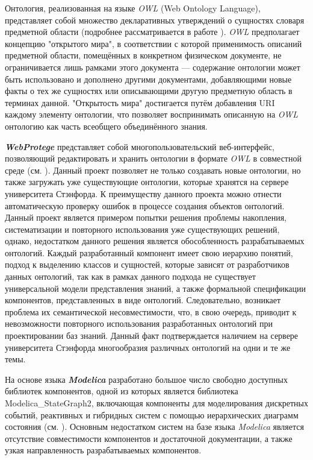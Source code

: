 Онтология, реализованная на языке \textit{OWL} (Web Ontology Language), представляет собой множество декларативных утверждений о сущностях словаря предметной области (подробнее рассматривается в работе ). \textit{OWL} предполагает концепцию "открытого мира"{}, в соответствии с которой применимость описаний предметной области, помещённых в конкретном физическом документе, не ограничивается лишь рамками этого документа --- содержание онтологии может быть использовано и дополнено другими документами, добавляющими новые факты о тех же сущностях или описывающими другую предметную область в терминах данной. "Открытость мира"{} достигается путём добавления URI каждому элементу онтологии, что позволяет воспринимать описанную на \textit{OWL} онтологию как часть всеобщего объединённого знания.

\textbf{\textit{WebProtege}} представляет собой многопользовательский веб-интерфейс, позволяющий редактировать и хранить онтологии в формате \textit{OWL} в совместной среде (см. ). Данный проект позволяет не только создавать новые онтологии, но также загружать уже существующие онтологии, которые хранятся на сервере университета Стэнфорда. К преимуществу данного проекта можно отнести автоматическую проверку ошибок в процессе создания объектов онтологий. Данный проект является примером попытки решения проблемы накопления, систематизации и повторного использования уже существующих решений, однако, недостатком данного решения является обособленность разрабатываемых онтологий. Каждый разработанный компонент имеет свою иерархию понятий, подход к выделению классов и сущностей, которые зависят от разработчиков данных онтологий, так как в рамках данного подхода не существует универсальной модели представления знаний, а также формальной спецификации компонентов, представленных в виде онтологий. Следовательно, возникает проблема их семантической несовместимости, что, в свою очередь, приводит к невозможности повторного использования разработанных онтологий при проектировании баз знаний. Данный факт подтверждается наличием на сервере университета Стэнфорда многообразия различных онтологий на одни и те же темы.

На основе языка \textbf{\textit{Modelica}} разработано большое число свободно доступных библиотек компонентов, одной из которых является библиотека Modelica\_StateGraph2, включающая компоненты для моделирования дискретных событий, реактивных и гибридных систем с помощью иерархических диаграмм состояния (см. ). Основным недостатком систем на базе языка \textit{Modelica} является отсутствие совместимости компонентов и достаточной документации, а также узкая направленность разрабатываемых компонентов.

